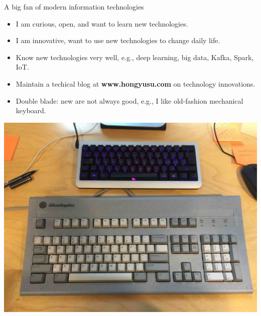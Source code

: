 \documentclass[first=dgreen,second=purple,logo=yellowexc]{aaltoslides}
\begin{document}
\begin{frame}{A big fan of modern information technologies}
	\begin{itemize}
		\item I am curious, open, and want to learn new technologies.
		\item I am innovative, want to use new technologies to change daily life.
		\item Know new technologies very well, e.g., deep learning, big data, Kafka, Spark, IoT.
		\item Maintain a techical blog at {\bf www.hongyusu.com} on technology innovations.
		\item Double blade: new are not always good, e.g., I like old-fashion mechanical keyboard. 
	\end{itemize}	
	\begin{center}
		\includegraphics[scale=0.03]{./plots/keyboard.jpg}
	\end{center}
\end{frame}
\end{document}
